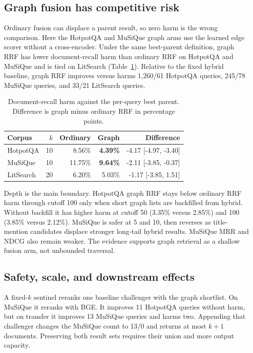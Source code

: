 \documentclass[10pt,twocolumn]{article}
\begin{document}
\subsection{Graph fusion has competitive risk}

Ordinary fusion can displace a parent result, so zero harm is the wrong
comparison. Here the HotpotQA and MuSiQue graph arms use the learned edge
scorer without a cross-encoder. Under the same best-parent definition, graph RRF has lower
document-recall harm than ordinary RRF on HotpotQA and MuSiQue and is tied on
LitSearch (Table~\ref{tab:fusionrisk}). Relative to the fixed hybrid baseline,
graph RRF improves versus harms 1,260/61 HotpotQA queries, 245/78 MuSiQue
queries, and 33/21 LitSearch queries.

\begin{table}[t]
  \centering
  \caption{Document-recall harm against the per-query best parent. Difference
  is graph minus ordinary RRF in percentage points.}
  \label{tab:fusionrisk}
  \small
  \setlength{\tabcolsep}{4pt}
  \begin{tabular}{lrrrr}
    \toprule
    Corpus & $k$ & Ordinary & Graph & Difference \\
    \midrule
    HotpotQA & 10 & 8.56\% & \textbf{4.39\%} & -4.17 [-4.97, -3.40] \\
    MuSiQue & 10 & 11.75\% & \textbf{9.64\%} & -2.11 [-3.85, -0.37] \\
    LitSearch & 20 & 6.20\% & 5.03\% & -1.17 [-3.85, 1.51] \\
    \bottomrule
  \end{tabular}
\end{table}

Depth is the main boundary. HotpotQA graph RRF stays below ordinary RRF harm
through cutoff 100 only when short graph lists are backfilled from hybrid.
Without backfill it has higher harm at cutoff 50 (3.35\% versus 2.85\%) and
100 (3.85\% versus 2.12\%).
MuSiQue is safer at 5 and 10, then reverses as title-mention candidates displace
stronger long-tail hybrid results. MuSiQue MRR and NDCG also remain weaker.
The evidence supports graph retrieval as a shallow fusion arm, not unbounded
traversal.

\subsection{Safety, scale, and downstream effects}

A fixed-$k$ sentinel reranks one baseline challenger with the graph shortlist.
On MuSiQue it reranks with BGE.
It improves 11 HotpotQA queries without harm, but on transfer it improves 13
MuSiQue queries and harms two. Appending that challenger changes the MuSiQue
count to 13/0 and returns at most $k+1$ documents. Preserving both result sets
requires their union and more output capacity.
\end{document}
